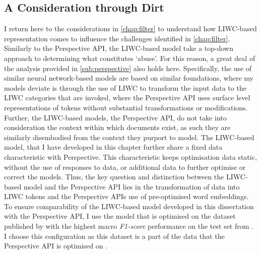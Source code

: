 
\subsection{A Consideration through Dirt}\label{sub:LIWC_model}
I return here to the considerations in \cref{chap:filter} to understand how LIWC-based representation comes to influence the challenges identified in \cref{chap:filter}.
Similarly to the Perspective API, the LIWC-based model take a top-down approach to determining what constitutes `abuse'. For this reason, a great deal of the analysis provided in \cref{sub:perspective} also holds here.
Specifically, the use of similar neural network-based models are based on similar foundations, where my models deviate is through the use of LIWC \cite{Pennebaker:2001} to transform the input data to the LIWC categories that are invoked, where the Perspective API uses surface level representations of tokens without substantial transformations or modifications.
Further, the LIWC-based models,  the Perspective API, do not take into consideration the context within which documents exist, as such they are similarly disembodied from the context they purport to model.
The LIWC-based model, that I have developed in this chapter further share a fixed data characteristic with Perspective.
This characteristic keeps optimisation data static, without the use of responses to data, or additional data to further optimise or correct the models.
Thus, the key question and distinction between the LIWC-based model and the Perspective API lies in the transformation of data into LIWC tokens and the Perspective APIs use of pre-optimised word embeddings.
To ensure comparability of the LIWC-based model developed in this dissertation with the Perspective API, I use the model that is optimised on the dataset published by \citet{Wulczyn:2017} with the highest macro \textit{F1-score} performance on the test set from \citet{Wulczyn:2017}.
I choose this configuration as this dataset is a part of the data that the Perspective API is optimised on \citep{Perspective:Github}.


